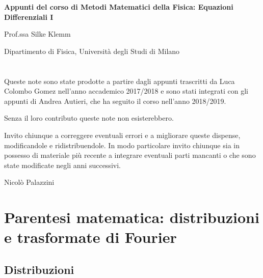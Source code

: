 \documentclass[a4paper,11pt]{report}
\begin{document}
\begin{titlepage}
\centering

\vspace*{\fill}

\Huge{\bf Appunti del corso di Metodi Matematici della Fisica: Equazioni Differenziali I}

\vspace*{\fill}

\LARGE{Prof.ssa Silke Klemm}

\vspace*{1cm}

\Large{Dipartimento di Fisica, Universit\`a degli Studi di Milano}

\end{titlepage}

\newpage\null\thispagestyle{empty}\newpage


\chapter*{}
Queste note sono state prodotte a partire dagli appunti trascritti da Luca Colombo Gomez nell'anno accademico 2017/2018 e sono stati integrati con gli appunti di Andrea Autieri, che ha seguito il corso nell'anno 2018/2019.

Senza il loro contributo queste note non esisterebbero.

Invito chiunque a correggere eventuali errori e a migliorare queste dispense, modificandole e ridistribuendole. In modo particolare invito chiunque sia in possesso di materiale pi\`u recente a integrare eventuali parti mancanti o che sono state modificate negli anni successivi.

\begin{flushright} Nicol\`o Palazzini \end{flushright}

\tableofcontents

\chapter{Parentesi matematica: distribuzioni e trasformate di Fourier}


\section{Distribuzioni}
\end{document}

